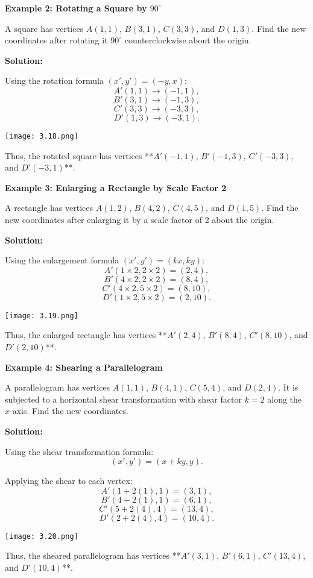 \begin{flushleft}
	\textbf{Example 2: Rotating a Square by $90^\circ$}
	
	A square has vertices $A(1,1)$, $B(3,1)$, $C(3,3)$, and $D(1,3)$. Find the new coordinates after rotating it $90^\circ$ counterclockwise about the origin.
	
	\textbf{Solution:}
	
	Using the rotation formula $(x', y') = (-y, x)$:
	\[
	A'(1,1) \to (-1,1),
	\]
	\[
	B'(3,1) \to (-1,3),
	\]
	\[
	C'(3,3) \to (-3,3),
	\]
	\[
	D'(1,3) \to (-3,1).
	\]
	\begin{center}
		\texttt{[image: 3.18.png]}
	\end{center}
	Thus, the rotated square has vertices **$A'(-1,1)$, $B'(-1,3)$, $C'(-3,3)$, and $D'(-3,1)$**.
\end{flushleft}

\begin{flushleft}
	\textbf{Example 3: Enlarging a Rectangle by Scale Factor 2}
	
	A rectangle has vertices $A(1,2)$, $B(4,2)$, $C(4,5)$, and $D(1,5)$. Find the new coordinates after enlarging it by a scale factor of 2 about the origin.
	
	\textbf{Solution:}
	
	Using the enlargement formula $(x', y') = (kx, ky)$:
	\[
	A'(1 \times 2, 2 \times 2) = (2,4),
	\]
	\[
	B'(4 \times 2, 2 \times 2) = (8,4),
	\]
	\[
	C'(4 \times 2, 5 \times 2) = (8,10),
	\]
	\[
	D'(1 \times 2, 5 \times 2) = (2,10).
	\]
	\begin{center}
		\texttt{[image: 3.19.png]}
	\end{center}
	Thus, the enlarged rectangle has vertices **$A'(2,4)$, $B'(8,4)$, $C'(8,10)$, and $D'(2,10)$**.
\end{flushleft}

\begin{flushleft}
	\textbf{Example 4: Shearing a Parallelogram}
	
	A parallelogram has vertices $A(1,1)$, $B(4,1)$, $C(5,4)$, and $D(2,4)$. It is subjected to a horizontal shear transformation with shear factor $k=2$ along the $x$-axis. Find the new coordinates.
	
	\textbf{Solution:}
	
	Using the shear transformation formula:
	\[
	(x', y') = (x + ky, y).
	\]
	
	Applying the shear to each vertex:
	\[
	A'(1 + 2(1), 1) = (3,1),
	\]
	\[
	B'(4 + 2(1), 1) = (6,1),
	\]
	\[
	C'(5 + 2(4), 4) = (13,4),
	\]
	\[
	D'(2 + 2(4), 4) = (10,4).
	\]
	\begin{center}
		\texttt{[image: 3.20.png]}
	\end{center}
	Thus, the sheared parallelogram has vertices **$A'(3,1)$, $B'(6,1)$, $C'(13,4)$, and $D'(10,4)$**.
\end{flushleft}
